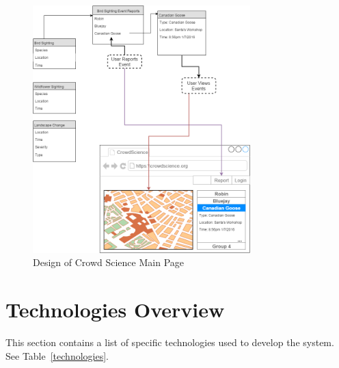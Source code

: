\begin{figure}[tbh]
\begin{center}
\includegraphics[width=0.75\textwidth]{./figures/overviewdesign.png}
\end{center}
\caption{Design of Crowd Science Main Page\label{overviewdesign}}
\end{figure}

\section{Technologies Overview}
This section contains a list of specific technologies used to develop the system.  See Table~\ref{technologies}.  

